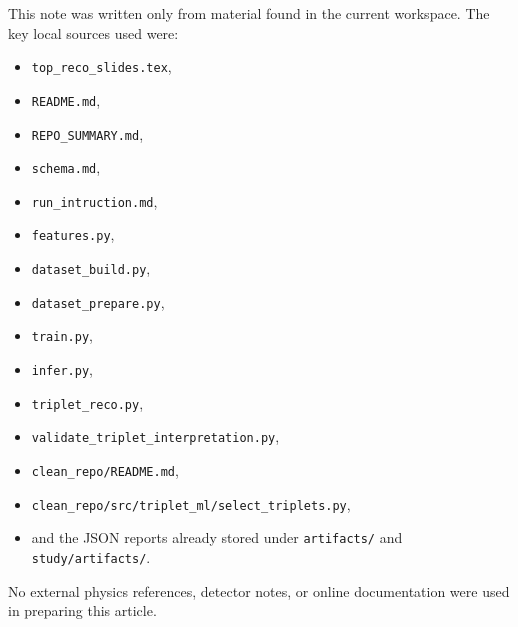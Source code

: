 \documentclass[11pt]{article}
\begin{document}
This note was written only from material found in the current workspace. The key local sources used were:
\begin{itemize}[leftmargin=*]
  \item \texttt{top\_reco\_slides.tex},
  \item \texttt{README.md},
  \item \texttt{REPO\_SUMMARY.md},
  \item \texttt{schema.md},
  \item \texttt{run\_intruction.md},
  \item \texttt{features.py},
  \item \texttt{dataset\_build.py},
  \item \texttt{dataset\_prepare.py},
  \item \texttt{train.py},
  \item \texttt{infer.py},
  \item \texttt{triplet\_reco.py},
  \item \texttt{validate\_triplet\_interpretation.py},
  \item \texttt{clean\_repo/README.md},
  \item \texttt{clean\_repo/src/triplet\_ml/select\_triplets.py},
  \item and the JSON reports already stored under \texttt{artifacts/} and \texttt{study/artifacts/}.
\end{itemize}

No external physics references, detector notes, or online documentation were used in preparing this article.
\end{document}
